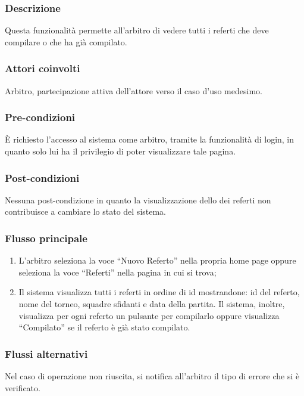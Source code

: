 \subsubsection*{Descrizione}
Questa funzionalità permette all'arbitro di vedere tutti i referti che deve compilare o che ha già compilato.

\subsubsection*{Attori coinvolti}
Arbitro, partecipazione attiva dell'attore verso il caso d'uso medesimo.

\subsubsection*{Pre-condizioni}
È richiesto l'accesso al sistema come arbitro, tramite la funzionalità di login, in quanto solo lui ha il privilegio di poter visualizzare tale pagina.

\subsubsection*{Post-condizioni}
Nessuna post-condizione in quanto la visualizzazione dello dei referti non contribuisce a cambiare lo stato del sistema.

\subsubsection*{Flusso principale}

\begin{enumerate}
	
	\item
	L'arbitro seleziona la voce ``Nuovo Referto'' nella propria home page oppure seleziona la voce ``Referti'' nella pagina in cui si trova;
	
	\item
	Il sistema visualizza tutti i referti in ordine di id mostrandone: id del referto, nome del torneo, squadre sfidanti e data della partita. Il sistema, inoltre, visualizza per ogni referto un pulsante per compilarlo oppure visualizza ``Compilato'' se il referto è già stato compilato. 
	
\end{enumerate}

\subsubsection*{Flussi alternativi}
Nel caso di operazione non riuscita, si notifica all'arbitro il tipo di errore che si è verificato.


